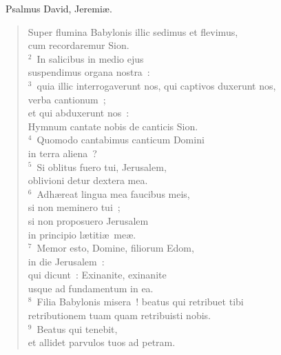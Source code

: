 ~\lettrine[lines=10,image=true,loversize=0.05,lraise=-0.03]{P}{}salmus David, Jeremi\ae . \begin{flushleft}\begin{verse}\vspace{6pt}Super flumina Babylonis illic sedimus et flevimus,\\ cum recordaremur Sion.\\
${}^{2}$~In salicibus in medio ejus\\ suspendimus organa nostra~:\\
${}^{3}$~quia illic interrogaverunt nos, qui captivos duxerunt nos,\\ verba cantionum~;\\ et qui abduxerunt nos~:\\ Hymnum cantate nobis de canticis Sion.\\
${}^{4}$~Quomodo cantabimus canticum Domini\\ in terra aliena~?\\
${}^{5}$~Si oblitus fuero tui, Jerusalem,\\ oblivioni detur dextera mea.\\
${}^{6}$~Adh\ae reat lingua mea faucibus meis,\\ si non meminero tui~;\\ si non proposuero Jerusalem\\ in principio l\ae titi\ae\ me\ae .\\
${}^{7}$~Memor esto, Domine, filiorum Edom,\\ in die Jerusalem~:\\ qui dicunt~: Exinanite, exinanite\\ usque ad fundamentum in ea.\\
${}^{8}$~Filia Babylonis misera~! beatus qui retribuet tibi\\ retributionem tuam quam retribuisti nobis.\\
${}^{9}$~Beatus qui tenebit,\\ et allidet parvulos tuos ad petram.\end{verse}\end{flushleft}


